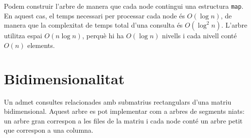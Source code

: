 Podem construir l'arbre de manera que cada node contingui una
estructura \texttt{map}. En aquest cas, el temps necessari per
processar cada node és $O(\log n)$, de manera que la complexitat de
temps total d'una consulta és $O(\log^2 n)$. L'arbre utilitza espai
$O(n \log n)$, perquè hi ha $O(\log n)$ nivells i cada nivell conté
$O(n)$ elements.

\section{Bidimensionalitat}


Un  admet consultes relacionades
amb submatrius rectangulars d'una matriu bidimensional. Aquest arbre
es pot implementar com a arbres de segments niats: un arbre gran
correspon a les files de la matriu i cada node conté un arbre petit
que correspon a una columna.

